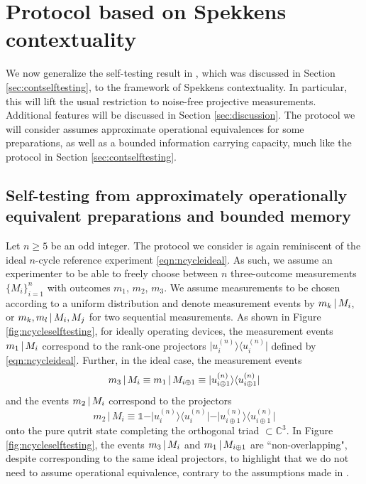\chapter{Protocol based on Spekkens contextuality}
\label{sec:protocols}
We now generalize the self-testing result in \cite{Bharti2019}, which was discussed in Section \ref{sec:contselftesting}, to the framework of Spekkens contextuality. In particular, this will lift the usual restriction to noise-free projective measurements. Additional features will be discussed in Section \ref{sec:discussion}. The protocol we will consider assumes approximate operational equivalences for some preparations, as well as a bounded information carrying capacity, much like the protocol in Section \ref{sec:contselftesting}.
\section{Self-testing from approximately operationally equivalent preparations and bounded memory}
Let $n\geq 5$ be an odd integer. The protocol we consider is again reminiscent of the ideal $n$-cycle reference experiment \ref{eqn:ncycleideal}. As such, we assume an experimenter to be able to freely choose between $n$ three-outcome measurements $\{M_i\}_{i=1}^n$ with outcomes $m_1$, $m_2$, $m_3$. We assume measurements to be chosen according to a uniform distribution and denote measurement events by  $m_k\thinspace\vert\thinspace M_i$, or $m_k,m_l\thinspace\vert\thinspace M_i,M_j$ for two sequential measurements. As shown in Figure \ref{fig:ncycleselftesting}, for ideally operating devices, the measurement events $m_1 \thinspace\vert\thinspace M_i$ correspond to the rank-one projectors $\vert u_i^{(n)}\rangle\langle u_i^{(n)}\vert$ defined by \ref{eqn:ncycleideal}. Further, in the ideal case, the measurement events \begin{equation*}
m_3\thinspace\vert\thinspace M_i\equiv m_1\thinspace\vert\thinspace M_{i\oplus 1}\equiv\vert u_{i\oplus 1}^{(n)}\rangle\langle u_{i\oplus 1}^{(n)}\vert
\end{equation*}and the events $m_2\thinspace\vert\thinspace M_i$ correspond to the projectors 
\begin{equation*}
m_2\,\vert\,M_i\equiv \mathbb{1}-\vert u_i^{(n)}\rangle\langle u_i^{(n)}\vert-\vert u_{i\oplus 1}^{(n)}\rangle\langle u_{i\oplus 1}^{(n)}\vert
\end{equation*} onto the pure qutrit state completing the orthogonal triad $\subset \mathbb{C}^3$. In Figure \ref{fig:ncycleselftesting}, the events $m_3\thinspace \vert\thinspace M_i$ and $m_1\thinspace\vert\thinspace M_{i\oplus 1}$ are ``non-overlapping", despite corresponding to the same ideal projectors, to highlight that we do not need to assume operational equivalence, contrary to the assumptions made in \cite{Kunjwal2019}.

